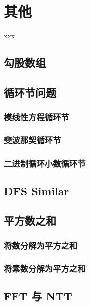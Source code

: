 \chapter{其他}
\begin{introduction}[本章内容提要]
	\item xxx
\end{introduction}

\section{勾股数组}

\section{循环节问题}
\subsection{模线性方程循环节}

\subsection{斐波那契循环节}

\subsection{二进制循环小数循环节}

\section{DFS Similar}


\section{平方数之和}

\subsection{将数分解为平方之和}


\subsection{将素数分解为平方之和}

\section{FFT 与 NTT}

